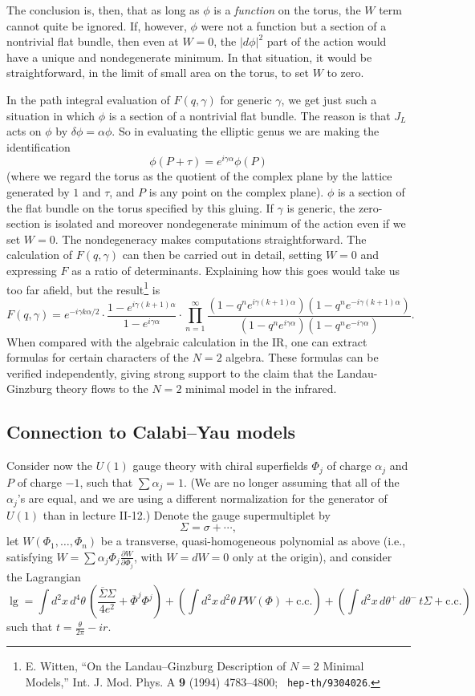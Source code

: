 The conclusion is, then, that as long as $\phi$ is a {\it function} on the
torus, the $W$
term cannot quite be ignored.  If, however, $\phi$ were not a function but a
section of a nontrivial
flat bundle, then even at $W=0$, the $|d\phi|^2$ part of the action would have
a unique and
nondegenerate minimum.  In that situation, it would be straightforward, in the
limit
of small area on the torus, to set $W$ to zero.

In the path integral evaluation of $F(q,\gamma)$ for generic $\gamma$, we get
just such a situation
in which $\phi$ is a section of a nontrivial flat bundle.
The reason is that  $J_L$ acts on $\phi$
by $\delta\phi=\alpha\phi$.  So in evaluating the elliptic genus
we are making the identification
$$\phi(P+\tau)=e^{i\gamma\alpha}\phi(P)$$
(where we regard the torus as the quotient of the complex plane by the lattice
generated
by $1$ and $\tau$, and $P$ is any point on the complex plane).
$\phi$ is a  section of the flat bundle on the torus specified by this gluing.
If $\gamma$ is generic, the zero-section is isolated and moreover
nondegenerate minimum
of the action even if we set $W=0$.  The nondegeneracy makes computations
straightforward.
The calculation of $F(q,\gamma)$ can then be carried out in detail, setting
$W=0$ and
expressing $F$ as a ratio of determinants.
Explaining how this goes would take us too far afield,
but the result\footnote{E. Witten, ``On the Landau--Ginzburg Description of
$N{=}2$ Minimal
Models,'' Int. J. Mod. Phys. A {\bf 9} (1994) 4783--4800; {\tt
hep-th/9304026}.} is
$$
F(q,\gamma)=e^{-i\gamma k\alpha/2}\cdot
\frac{1-e^{i\gamma(k+1)\alpha}}{1-e^{i\gamma\alpha}}
\cdot \prod_{n=1}^\infty \frac{(1-q^ne^{i\gamma(k+1)\alpha})(1-q^ne^{-i\gamma(k
+1)\alpha})}
{(1-q^ne^{i\gamma\alpha})(1-q^ne^{-i\gamma\alpha})} .
$$
When compared with the algebraic calculation in the IR, one can extract
formulas for
certain characters of the  $N{=}2$ algebra.  These formulas can be verified
independently,
giving strong support to the claim that the Landau-Ginzburg theory flows to
the $N=2$ minimal
model in the infrared.

\subsection{Connection to Calabi--Yau models}

Consider now the $U(1)$ gauge theory with chiral superfields $\Phi_j$ of
charge $\alpha_j$
and $P$ of charge $-1$, such that $\sum \alpha_j=1$.  (We are no longer
assuming that all
of the $\alpha_j$'s are equal, and we are using a different normalization for
the generator
of $U(1)$ than in lecture II-12.)  Denote the gauge supermultiplet by
$$\Sigma=\sigma+\cdots ,$$
let $W(\Phi_1,\dots,\Phi_n)$ be a transverse, quasi-homogeneous polynomial as
above
(i.e., satisfying $W=\sum\alpha_j\Phi_j\frac{\partial W}{\partial\Phi_j}$,
with $W=dW=0$ only at the origin),
and consider the Lagrangian
$$\lg=\int d^2x\,d^4\theta\,\left(\frac{\overline{\Sigma}\Sigma}{4e^2}+
\overline{\Phi}^j\Phi^j\right)
+\left(\int d^2x\,d^2\theta\, PW(\Phi)+ \mbox{c.c.}\right)
+\left(\int d^2x\,d\theta^+\,d\theta^-\,t\Sigma + \mbox{c.c.}\right) $$
such that $t=\frac\theta{2\pi}-ir$.

